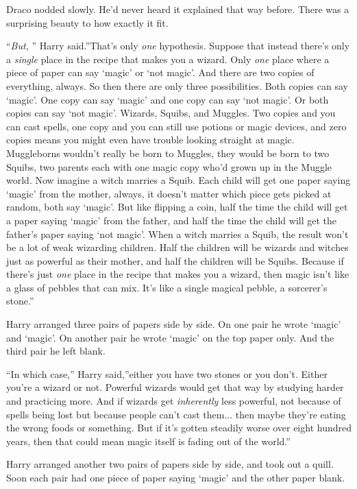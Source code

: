 Draco nodded slowly. He'd never heard it explained that way before.
There was a surprising beauty to how exactly it fit.

``\emph{But,} '' Harry said.''That's only \emph{one} hypothesis. Suppose
that instead there's only a \emph{single} place in the recipe that makes
you a wizard. Only \emph{one} place where a piece of paper can say
`magic' or `not magic'. And there are two copies of everything, always.
So then there are only three possibilities. Both copies can say `magic'.
One copy can say `magic' and one copy can say `not magic'. Or both
copies can say `not magic'. Wizards, Squibs, and Muggles. Two copies and
you can cast spells, one copy and you can still use potions or magic
devices, and zero copies means you might even have trouble looking
straight at magic. Muggleborns wouldn't really be born to Muggles, they
would be born to two Squibs, two parents each with one magic copy who'd
grown up in the Muggle world. Now imagine a witch marries a Squib. Each
child will get one paper saying `magic' from the mother, always, it
doesn't matter which piece gets picked at random, both say `magic'. But
like flipping a coin, half the time the child will get a paper saying
`magic' from the father, and half the time the child will get the
father's paper saying `not magic'. When a witch marries a Squib, the
result won't be a lot of weak wizarding children. Half the children will
be wizards and witches just as powerful as their mother, and half the
children will be Squibs. Because if there's just \emph{one} place in the
recipe that makes you a wizard, then magic isn't like a glass of pebbles
that can mix. It's like a single magical pebble, a sorcerer's stone.''

Harry arranged three pairs of papers side by side. On one pair he wrote
`magic' and `magic'. On another pair he wrote `magic' on the top paper
only. And the third pair he left blank.

``In which case,'' Harry said,''either you have two stones or you don't.
Either you're a wizard or not. Powerful wizards would get that way by
studying harder and practicing more. And if wizards get
\emph{inherently} less powerful, not because of spells being lost but
because people can't cast them... then maybe they're eating the
wrong foods or something. But if it's gotten steadily worse over eight
hundred years, then that could mean magic itself is fading out of the
world.''

Harry arranged another two pairs of papers side by side, and took out a
quill. Soon each pair had one piece of paper saying `magic' and the
other paper blank.


